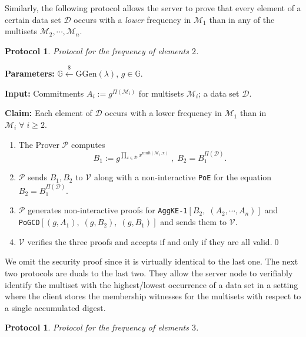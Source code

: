 \documentclass[11pt, lettersize, notitlepage, leqno, footskip=0.6cm]{article}
\newcommand{\pl}{\prod\limits}
\newcommand{\mc}{\mathcal}
\newcommand{\mb}{\mathbb}
\newcommand{\mr}{\mathrm}
\newcommand{\lamb}{\lambda}
\newcommand{\mP}{\mc{P}}
\newcommand{\V}{\mc{V}}
\newcommand{\vs}{\vspace{-0.15cm}}
\newcommand{\noin}{\noindent}
\newtheorem{Prot}[Thm]{Protocol}
\numberwithin{equation}{section}
\begin{document}
\vspace{0.2cm}

Similarly, the following protocol allows the server to prove that every element of a certain data set $\mc{D}$ occurs with a \textit{lower} frequency in $\mc{M}_1$ than in any of the multisets $\mc{M}_2,\cdots,\mc{M}_n$.

\begin{Prot} Protocol for the frequency of elements $2$.\end{Prot} \vspace{-0.3cm}

\noin \textbf{Parameters:} $\mb{G}\xleftarrow{\$} \mr{GGen}(\lamb)$,\; $g\in \mb{G}$.

\noin \textbf{Input:} Commitments $A_i := g^{\Pi(\mc{M}_i)}$ for multisets $\mc{M}_i$; a data set $\mc{D}$.

\noin \textbf{Claim:} Each element of $\mc{D}$ occurs with a lower frequency in $\mc{M}_1$ than in $\mc{M}_i\;\forall\;i\geq 2$. \vs

\begin{enumerate}[wide, labelwidth=!, labelindent=0pt] \vs

\item The Prover $\mP$ computes \vs $$B_1:= g^{\pl_{x\in\mc{D}} x^{\mr{mult(\mc{M}_1, x)}}}\;,\; B_2 = B_1^{\Pi(\mc{D})}.$$ \vspace{-0.8cm}

\item $\mP$ sends $B_1, B_2$ to $\V$ along with a non-interactive \verb|PoE| for the equation $B_2= B_1^{\Pi(\mc{D})}$. \vs

\item $\mP$ generates non-interactive proofs for \verb|AggKE-1|$[B_2,\;(A_2,\cdots,A_n)]$ and\\ \verb|PoGCD|$[(g, A_1),\;(g, B_2),\;(g,B_1)]$ and sends them to $\V$. \vs

\item $\V$ verifies the three proofs and accepts if and only if they are all valid.\qed\end{enumerate}

We omit the security proof since it is virtually identical to the last one. The next two protocols are duals to the last two. They allow the server node to verifiably identify the multiset with the highest/lowest occurrence of a data set in a setting where the client stores the membership witnesses for the multisets with respect to a single accumulated digest.

\begin{Prot} Protocol for the frequency of elements $3$.\end{Prot} \vspace{-0.3cm}
\end{document}
